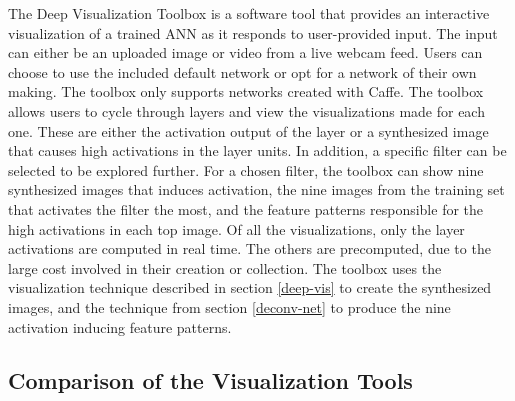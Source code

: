 The Deep Visualization Toolbox is a software tool that provides an interactive visualization of a trained ANN as it responds to user-provided input. The input can either be an uploaded image or video from a live webcam feed. Users can choose to use the included default network or opt for a network of their own making. The toolbox only supports networks created with Caffe. The toolbox allows users to cycle through layers and view the visualizations made for each one. These are either the activation output of the layer or a synthesized image that causes high activations in the layer units. In addition, a specific filter can be selected to be explored further. For a chosen filter, the toolbox can show nine synthesized images that induces activation, the nine images from the training set that activates the filter the most, and the feature patterns responsible for the high activations in each top image. Of all the visualizations, only the layer activations are computed in real time. The others are precomputed, due to the large cost involved in their creation or collection. The toolbox uses the visualization technique described in section \ref{deep-vis} to create the synthesized images, and the technique from section \ref{deconv-net} to produce the nine activation inducing feature patterns.


\subsection{Comparison of the Visualization Tools}

